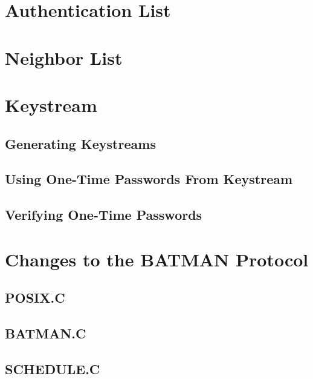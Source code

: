 \section{Authentication List}

\section{Neighbor List}

\section{Keystream}
\subsection{Generating Keystreams}
\subsection{Using One-Time Passwords From Keystream}
\subsection{Verifying One-Time Passwords}

\section{Changes to the BATMAN Protocol}
\subsection{POSIX.C}\label{subsect:posix.c}
\subsection{BATMAN.C}
\subsection{SCHEDULE.C}